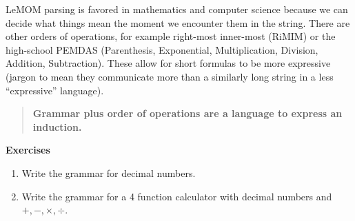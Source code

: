 LeMOM parsing is favored in mathematics and computer science because we can 
decide what things mean the moment we encounter them in the string.  
There are other orders of operations,
for example right-most inner-most (RiMIM) or the high-school PEMDAS
(Parenthesis, Exponential, Multiplication, Division, Addition, Subtraction). 
These allow for short formulas to be more expressive (jargon to mean they 
communicate more than a similarly long string in a less ``expressive'' language).

\begin{quote}
\textbf{Grammar plus order of operations are a language to express an induction.}
\end{quote}

\noindent\textbf{Exercises}
\begin{enumerate}
    \item Write the grammar for decimal numbers.
    \item Write the grammar for a 4 function calculator with decimal numbers
    and $+,-,\times, \div$.
\end{enumerate}
\medskip
